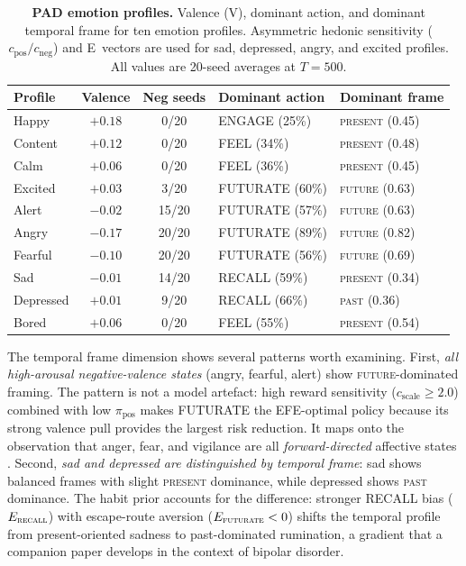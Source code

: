\documentclass[11pt,a4paper]{article}
\begin{document}
\begin{table}[htbp]
\centering
\caption{\textbf{PAD emotion profiles.} Valence (V), dominant action, and dominant temporal frame for ten emotion profiles. Asymmetric hedonic sensitivity ($c_{\text{pos}}/c_{\text{neg}}$) and E~vectors are used for sad, depressed, angry, and excited profiles. All values are 20-seed averages at $T = 500$.}
\label{tab:pad_profiles}
\small
\begin{tabular}{lccll}
\toprule
Profile & Valence & Neg seeds & Dominant action & Dominant frame \\
\midrule
Happy      & $+0.18$ & 0/20  & ENGAGE (25\%) & \textsc{present} (0.45) \\
Content    & $+0.12$ & 0/20  & FEEL (34\%)   & \textsc{present} (0.48) \\
Calm       & $+0.06$ & 0/20  & FEEL (36\%)   & \textsc{present} (0.45) \\
Excited    & $+0.03$ & 3/20  & FUTURATE (60\%) & \textsc{future} (0.63) \\
Alert      & $-0.02$ & 15/20 & FUTURATE (57\%) & \textsc{future} (0.63) \\
Angry      & $-0.17$ & 20/20 & FUTURATE (89\%) & \textsc{future} (0.82) \\
Fearful    & $-0.10$ & 20/20 & FUTURATE (56\%) & \textsc{future} (0.69) \\
Sad        & $-0.01$ & 14/20 & RECALL (59\%)   & \textsc{present} (0.34) \\
Depressed  & $+0.01$ & 9/20  & RECALL (66\%)   & \textsc{past} (0.36) \\
Bored      & $+0.06$ & 0/20  & FEEL (55\%)     & \textsc{present} (0.54) \\
\bottomrule
\end{tabular}
\end{table}

The temporal frame dimension shows several patterns worth examining. First, \emph{all high-arousal negative-valence states} (angry, fearful, alert) show \textsc{future}-dominated framing. The pattern is not a model artefact: high reward sensitivity ($c_{\text{scale}} \geq 2.0$) combined with low $\pi_{\text{pos}}$ makes FUTURATE the EFE-optimal policy because its strong valence pull provides the largest risk reduction. It maps onto the observation that anger, fear, and vigilance are all \emph{forward-directed} affective states \citep{smith1985patterns}. Second, \emph{sad and depressed are distinguished by temporal frame}: sad shows balanced frames with slight \textsc{present} dominance, while depressed shows \textsc{past} dominance. The habit prior accounts for the difference: stronger RECALL bias ($E_{\textsc{recall}}$) with escape-route aversion ($E_{\textsc{futurate}} < 0$) shifts the temporal profile from present-oriented sadness to past-dominated rumination, a gradient that a companion paper develops in the context of bipolar disorder.
\end{document}
